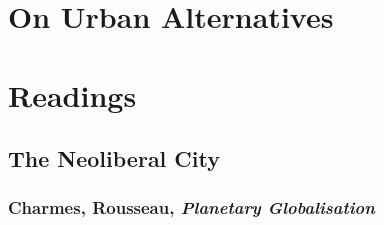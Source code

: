 \documentclass{article}
\begin{document}
\section{On Urban Alternatives}


\section{Readings}

\subsection{The Neoliberal City}

\subsubsection{Charmes, Rousseau, \textit{Planetary Globalisation}}
\end{document}
